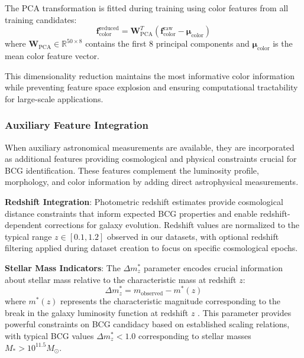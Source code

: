 \documentclass[twocolumn,10pt]{aastex631}
\begin{document}
The PCA transformation is fitted during training using color features from all training candidates:
\begin{equation}
\mathbf{f}_{\text{color}}^{\text{reduced}} = \mathbf{W}_{\text{PCA}}^T (\mathbf{f}_{\text{color}}^{\text{raw}} - \boldsymbol{\mu}_{\text{color}})
\end{equation}
where $\mathbf{W}_{\text{PCA}} \in \mathbb{R}^{50 \times 8}$ contains the first 8 principal components and $\boldsymbol{\mu}_{\text{color}}$ is the mean color feature vector.

This dimensionality reduction maintains the most informative color information while preventing feature space explosion and ensuring computational tractability for large-scale applications.

\subsubsection{Auxiliary Feature Integration}

When auxiliary astronomical measurements are available, they are incorporated as additional features providing cosmological and physical constraints crucial for BCG identification. These features complement the luminosity profile, morphology, and color information by adding direct astrophysical measurements.

\textbf{Redshift Integration}: Photometric redshift estimates provide cosmological distance constraints that inform expected BCG properties and enable redshift-dependent corrections for galaxy evolution. Redshift values are normalized to the typical range $z \in [0.1, 1.2]$ observed in our datasets, with optional redshift filtering applied during dataset creation to focus on specific cosmological epochs.

\textbf{Stellar Mass Indicators}: The $\Delta m^*_z$ parameter encodes crucial information about stellar mass relative to the characteristic mass at redshift $z$:
\begin{equation}
\Delta m^*_z = m_{\text{observed}} - m^*(z)
\end{equation}
where $m^*(z)$ represents the characteristic magnitude corresponding to the break in the galaxy luminosity function at redshift $z$ \citep{Rykoff2016DES}. This parameter provides powerful constraints on BCG candidacy based on established scaling relations, with typical BCG values $\Delta m^*_z < 1.0$ corresponding to stellar masses $M_* > 10^{11.5} M_{\odot}$.
\end{document}
